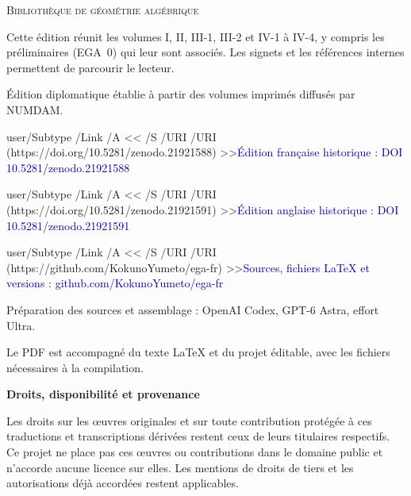 \documentclass[11pt,a4paper]{article}
\newcommand{\editionlink}[2]{\leavevmode\pdfstartlink user{/Subtype /Link /A << /S /URI /URI (#1) >>}\textcolor{navy}{#2}\pdfendlink}
\begin{document}
\color{navy}
\noindent\textsc{Bibliothèque de géométrie algébrique}\par
\vspace{22mm}
\par
\vspace{9mm}
\par
\vspace{18mm}
\par
\vspace{3mm}
\par
\vspace{10mm}
\color{muted}
\noindent Cette édition réunit les volumes I, II, III-1, III-2 et IV-1 à IV-4,
y compris les préliminaires (EGA~0) qui leur sont associés.
Les signets et les références internes permettent de parcourir le lecteur.\par
\vspace{5mm}
\noindent Édition diplomatique établie à partir des volumes imprimés
diffusés par NUMDAM.\par
\vspace{9mm}
\noindent\editionlink{https://doi.org/10.5281/zenodo.21921588}{Édition française historique : DOI 10.5281/zenodo.21921588}\par
\vspace{3mm}
\noindent\editionlink{https://doi.org/10.5281/zenodo.21921591}{Édition anglaise historique : DOI 10.5281/zenodo.21921591}\par
\vspace{3mm}
\noindent\editionlink{https://github.com/KokunoYumeto/ega-fr}{Sources, fichiers LaTeX et versions : github.com/KokunoYumeto/ega-fr}\par
\vfill
\small
\noindent Préparation des sources et assemblage : OpenAI Codex,
GPT-6 Astra, effort Ultra.\par
\vspace{3mm}
\noindent Le PDF est accompagné du texte LaTeX et du projet éditable,
avec les fichiers nécessaires à la compilation.\par

\clearpage
\begingroup
\small
\noindent\textbf{Droits, disponibilité et provenance}

Les droits sur les œuvres originales et sur toute contribution protégée à ces traductions et transcriptions dérivées restent ceux de leurs titulaires respectifs. Ce projet ne place pas ces œuvres ou contributions dans le domaine public et n'accorde aucune licence sur elles. Les mentions de droits de tiers et les autorisations déjà accordées restent applicables.
\end{document}

